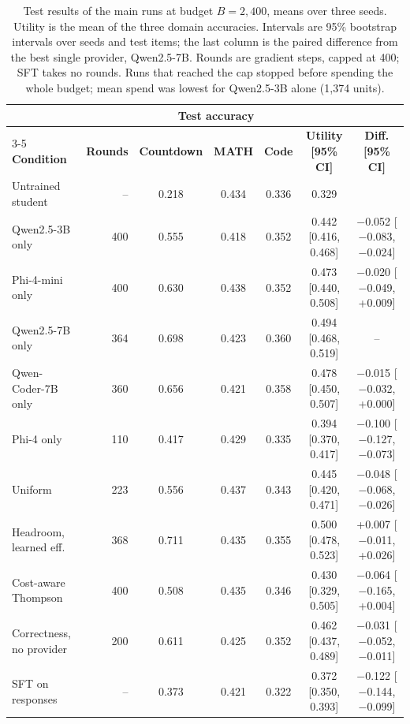 \begin{table}[htbp]
\centering
\footnotesize
\setlength{\tabcolsep}{2.5pt}
\begin{tabular}{@{}lrccccc@{}}
\toprule
 & & \multicolumn{3}{c}{\textbf{Test accuracy}} & & \\
\cmidrule(l){3-5}
\textbf{Condition} & \textbf{Rounds} & \textbf{Countdown} & \textbf{MATH} & \textbf{Code} & \textbf{Utility [95\% CI]} & \textbf{Diff. [95\% CI]} \\
\midrule
Untrained student & -- & 0.218 & 0.434 & 0.336 & 0.329 & \\
\midrule
Qwen2.5-3B only & 400 & 0.555 & 0.418 & 0.352 & 0.442 [0.416, 0.468] & $-$0.052 [$-$0.083, $-$0.024] \\
Phi-4-mini only & 400 & 0.630 & 0.438 & 0.352 & 0.473 [0.440, 0.508] & $-$0.020 [$-$0.049, +0.009] \\
Qwen2.5-7B only & 364 & 0.698 & 0.423 & 0.360 & 0.494 [0.468, 0.519] & -- \\
Qwen-Coder-7B only & 360 & 0.656 & 0.421 & 0.358 & 0.478 [0.450, 0.507] & $-$0.015 [$-$0.032, +0.000] \\
Phi-4 only & 110 & 0.417 & 0.429 & 0.335 & 0.394 [0.370, 0.417] & $-$0.100 [$-$0.127, $-$0.073] \\
\midrule
Uniform & 223 & 0.556 & 0.437 & 0.343 & 0.445 [0.420, 0.471] & $-$0.048 [$-$0.068, $-$0.026] \\
Headroom, learned eff. & 368 & 0.711 & 0.435 & 0.355 & 0.500 [0.478, 0.523] & +0.007 [$-$0.011, +0.026] \\
Cost-aware Thompson & 400 & 0.508 & 0.435 & 0.346 & 0.430 [0.329, 0.505] & $-$0.064 [$-$0.165, +0.004] \\
\midrule
Correctness, no provider & 200 & 0.611 & 0.425 & 0.352 & 0.462 [0.437, 0.489] & $-$0.031 [$-$0.052, $-$0.011] \\
SFT on responses & -- & 0.373 & 0.421 & 0.322 & 0.372 [0.350, 0.393] & $-$0.122 [$-$0.144, $-$0.099] \\
\bottomrule
\end{tabular}
\caption{Test results of the main runs at budget $B = 2{,}400$, means over three seeds. Utility is the mean of the three domain accuracies. Intervals are 95\% bootstrap intervals over seeds and test items; the last column is the paired difference from the best single provider, Qwen2.5-7B. Rounds are gradient steps, capped at 400; SFT takes no rounds. Runs that reached the cap stopped before spending the whole budget; mean spend was lowest for Qwen2.5-3B alone (1,374 units).}
\label{ca:tab:h3}
\end{table}
